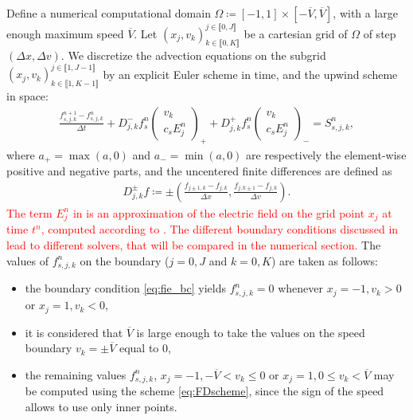 \documentclass{article}
\numberwithin{equation}{section}
\newcommand{\todo}[1]{{\color{red}\textbf{#1}}}
\newcommand{\vv}[1]{\begin{pmatrix} #1 \end{pmatrix}} %
\begin{document}
Define a numerical computational domain $\Omega \coloneqq [-1,1] \times [-\overline{V},\overline{V}]$, with a large enough maximum speed $\overline{V}$. Let $(x_j, v_k)^{j\in\llbracket0,J\rrbracket}_{k\in\llbracket0,K\rrbracket}$ be a cartesian grid of $\Omega$ of step $(\Delta x, \Delta v)$. We discretize the advection equations on the subgrid $(x_j, v_k)^{j\in\llbracket1,J-1\rrbracket}_{k\in\llbracket1,K-1\rrbracket}$ by an explicit Euler scheme in time, and the upwind scheme in space:
\begin{align}\label{eq:FDscheme}
	\frac{f_{s,j,k}^{n+1} - f_{s,j,k}^{n}}{\Delta t} + D^-_{j,k} f_s^n \vv{v_k\\c_s E_j^n}_{+} +D^+_{j,k} f_s^n \vv{v_k\\c_s E_j^n}_{-} = S_{s,j,k}^n,
\end{align}
where $a_+ = \max(a,0)$ and $a_{-} = \min(a,0)$ are respectively the element-wise positive and negative parts, and the uncentered finite differences are defined as
\begin{align*}
	D^{\pm}_{j,k} f \coloneqq \pm \left(\frac{f_{j\pm 1,k} - f_{j,k}}{\Delta x}, \frac{f_{j,k\pm 1} - f_{j,k}}{\Delta v}\right).
\end{align*}
\textcolor{red}{The term $E_j^n$ in  is an approximation of the electric field on the grid point $x_j$ at time $t^n$, computed according to . The different boundary conditions discussed in  lead to different solvers, that will be compared in the numerical section.}
The values of $f_{s,j,k}^n$ on the boundary ($j=0, J$ and $k=0, K$) are taken as follows:
\begin{itemize}
\item the boundary condition \cref{eq:fie_bc} yields $f_{s,j,k}^n = 0$ whenever $x_j=-1, v_k > 0$ or $x_j=1, v_k < 0$,
\item it is considered that $\overline{V}$ is large enough to take the values on the speed boundary $v_k = \pm \overline{V}$ equal to 0,
\item the remaining values $f_{s,j,k}^n$, $x_j=-1, -\overline{V} < v_k \leqslant 0$ or $x_j=1, 0 \leqslant v_k < \overline{V}$ may be computed using the scheme \cref{eq:FDscheme}, since the sign of the speed allows to use only inner points.
\end{itemize}

\end{document}
